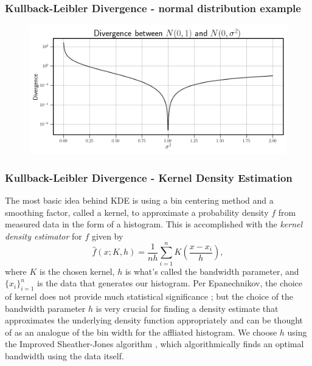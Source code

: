 \documentclass[11pt,aspectratio=169]{beamer}
\newcommand{\parens}[1]{\left(#1\right)}
\begin{document}
    \begin{frame}
        \frametitle{Kullback-Leibler Divergence - normal distribution example}
        \begin{figure}
            \centering
            \includegraphics[width=\textwidth]{../Figures/divergence_example.png}
        \end{figure}
    \end{frame}

    \begin{frame}
        \frametitle{Kullback-Leibler Divergence - Kernel Density Estimation}
        The most 
        basic idea behind KDE is using a bin centering method and a smoothing factor, 
        called a kernel, to approximate a probability density $f$ from measured data in the form 
        of a histogram. This is accomplished with the \emph{kernel density estimator} for $f$
        given by
        \begin{equation}
            \hat{f}(x; K, h) = \frac{1}{nh}\sum_{i = 1}^n K\parens{\frac{x - x_i}{h}},
        \end{equation}
        where $K$ is the chosen kernel, $h$ is what's called the bandwidth parameter, and 
        $\{x_i\}_{i=1}^n$ is the data that generates our histogram. Per Epanechnikov, 
        the choice of kernel does not provide much statistical significance \cite{epanechnikov}; 
        but the choice of the bandwidth parameter $h$ is very crucial for finding a density estimate
        that approximates the underlying density function appropriately and can be thought of as an 
        analogue of the bin width for the affliated histogram. We choose $h$ using the 
        Improved Sheather-Jones algorithm \cite{botev}, which algorithmically finds an optimal 
        bandwidth using the data itself.
    \end{frame}
\end{document}
